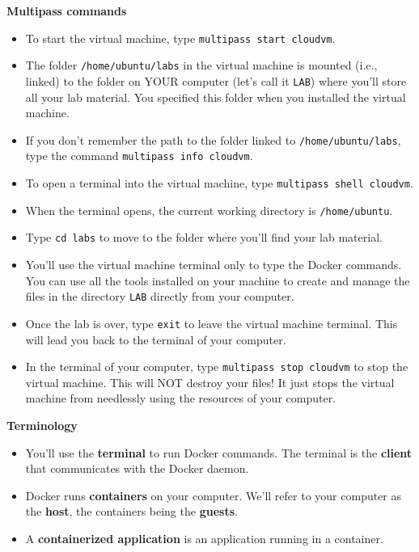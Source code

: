 \documentclass[
]{article}
\providecommand{\tightlist}{%
  \setlength{\itemsep}{0pt}\setlength{\parskip}{0pt}}
\newenvironment{infobox}[1]
  {
  \begin{itemize}
  \renewcommand{\labelitemi}{
    \raisebox{-.7\height}[0pt][0pt]{
      
    }
  }
  \setlength{\fboxsep}{1em}
  \begin{whitebox}
  \item
  }
  {
  \end{whitebox}
  \end{itemize}
  }
\theoremstyle{definition}
\theoremstyle{definition}
\theoremstyle{definition}
\theoremstyle{remark}
\begin{document}
\begin{infobox}{warning}

\textbf{Multipass commands}

\begin{itemize}
\item
  To start the virtual machine, type \texttt{multipass\ start\ cloudvm}.
\item
  The folder \texttt{/home/ubuntu/labs} in the virtual machine is mounted (i.e., linked) to the folder
  on YOUR computer (let's call it \texttt{LAB}) where you'll store all your lab material.
  You specified this folder when you installed the virtual machine.
\item
  If you don't remember the path to the folder linked to \texttt{/home/ubuntu/labs}, type the
  command \texttt{multipass\ info\ cloudvm}.
\item
  To open a terminal into the virtual machine, type \texttt{multipass\ shell\ cloudvm}.
\item
  When the terminal opens, the current working directory is \texttt{/home/ubuntu}.
\item
  Type \texttt{cd\ labs} to move to the folder where you'll find your lab material.
\item
  You'll use the virtual machine terminal only to type the Docker commands.
  You can use all the tools installed on your machine to create and manage the files
  in the directory \texttt{LAB} directly from your computer.
\item
  Once the lab is over, type \texttt{exit} to leave the virtual machine terminal. This will lead you back
  to the terminal of your computer.
\item
  In the terminal of your computer, type \texttt{multipass\ stop\ cloudvm} to stop the virtual machine.
  This will NOT destroy your files! It just stops the virtual machine from needlessly using the resources of your computer.
\end{itemize}

\end{infobox}

\begin{infobox}{warning}

\textbf{Terminology}

\begin{itemize}
\item
  You'll use the \textbf{terminal} to run Docker commands.
  The terminal is the \textbf{client} that communicates with
  the Docker daemon.
\item
  Docker runs \textbf{containers} on your computer.
  We'll refer to your computer as the \textbf{host},
  the containers being the \textbf{guests}.
\end{itemize}

\begin{itemize}
\tightlist
\item
  A \textbf{containerized application}
  is an application running in a container.
\end{itemize}

\end{infobox}
\end{document}
